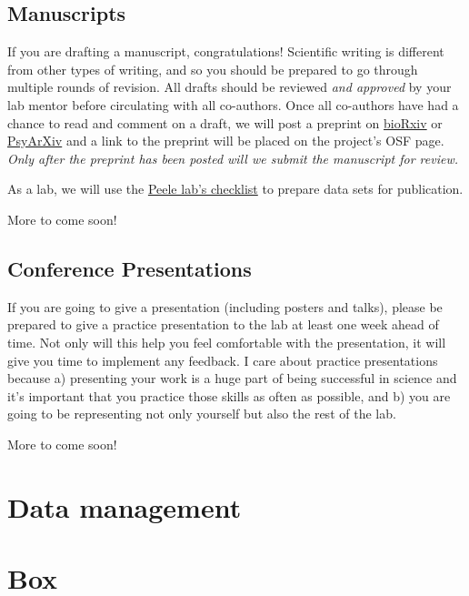 \documentclass[]{book}
\begin{document}
\hypertarget{manuscripts}{%
\subsection{Manuscripts}\label{manuscripts}}

If you are drafting a manuscript, congratulations! Scientific writing is different from other types of writing, and so you should be prepared to go through multiple rounds of revision. All drafts should be reviewed \emph{and approved} by your lab mentor before circulating with all co-authors. Once all co-authors have had a chance to read and comment on a draft, we will post a preprint on \href{https://www.biorxiv.org/}{bioRxiv} or \href{https://psyarxiv.com/}{PsyArXiv} and a link to the preprint will be placed on the project's OSF page. \emph{Only after the preprint has been posted will we submit the manuscript for review.}

As a lab, we will use the \href{https://github.com/jpeelle/paperchecklist/blob/master/checklist.pdf}{Peele lab's checklist} to prepare data sets for publication.

More to come soon!

\hypertarget{conference-presentations}{%
\subsection{Conference Presentations}\label{conference-presentations}}

If you are going to give a presentation (including posters and talks), please be prepared to give a practice presentation to the lab at least one week ahead of time. Not only will this help you feel comfortable with the presentation, it will give you time to implement any feedback. I care about practice presentations because a) presenting your work is a huge part of being successful in science and it's important that you practice those skills as often as possible, and b) you are going to be representing not only yourself but also the rest of the lab.

More to come soon!

\hypertarget{data-management}{%
\section{Data management}\label{data-management}}

\hypertarget{box}{%
\section{Box}\label{box}}
\end{document}
